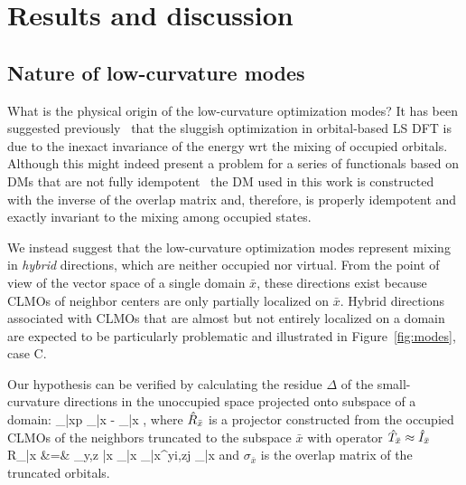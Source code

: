 \documentclass[aps,prl,twocolumn,reprint,amsmath,amssymb]{revtex4-1}
\begin{document}
\section{Results and discussion}

\subsection{Nature of low-curvature modes} \label{marker:nature} 

What is the physical origin of the low-curvature optimization modes? 
It has been suggested previously~\cite{goedecker1999linear} that the sluggish optimization in orbital-based LS DFT is due to the inexact invariance of the energy wrt the mixing of occupied orbitals. 
Although this might indeed present a problem for a series of functionals based on DMs that are not fully idempotent~\cite{Galli-90s,grumbach} the DM used in this work is constructed with the inverse of the overlap matrix and, therefore, is properly idempotent and exactly invariant to the mixing among occupied states. 

We instead suggest that the low-curvature optimization modes represent mixing in \emph{hybrid} directions, which are neither occupied nor virtual. From the point of view of the vector space of a single domain $\bar{x}$, these directions exist because CLMOs of neighbor centers are only partially localized on $\bar{x}$. 
Hybrid directions associated with CLMOs that are almost but not entirely localized on a domain are expected to be particularly problematic and illustrated in Figure~\ref{fig:modes}, case C. 

Our hypothesis can be verified by calculating the residue $\Delta$ of the small-curvature directions  in the unoccupied space projected onto subspace of a domain:
%
\bea
\label{eq:residue}
\Delta_{\bar{x}p} \equiv {} _{\bar{x}} - _{\bar{x}} , 
\eea
%
where $\hat{R}_{\bar{x}}$ is a projector constructed from the occupied CLMOs of the neighbors truncated to the subspace $\bar{x}$ with operator $\hat{T}_{\bar{x}} \approx \hat{I}_{\bar{x}}$
\bea
{R}_{\bar{x}} &=& \sum_{y,z \in \bar{x}} _{\bar{x}}  \sigma_{\bar{x}}^{yi,zj}  _{\bar{x}}
\label{eq:C}
\eea
%
and $\sigma_{\bar{x}}$ is the overlap matrix of the truncated orbitals.
\end{document}
